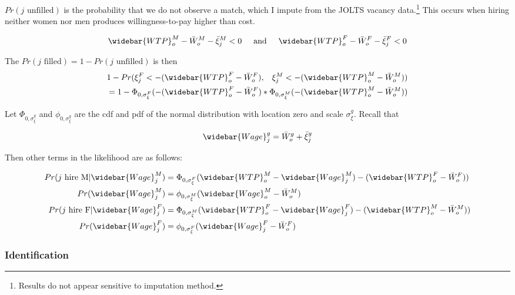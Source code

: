 \documentclass[11pt]{article}
\begin{document}
$Pr(\text{$j$ unfilled}) $ is the probability that we do not observe a match, which I impute from the JOLTS vacancy data.\footnote{Results do not appear sensitive to imputation method.} This occurs when hiring neither women nor men produces willingness-to-pay higher than cost.

\begin{align*}
 \widebar{WTP}^M_o - \bar{W}^M_o - \bar{\xi}^M_j < 0 \hspace{5mm} \text{and} \hspace{5mm} \widebar{WTP}^F_o - \bar{W}^F_o -  \bar{\xi}^F_j < 0 \\
\end{align*}

The $Pr( \text{$j$ filled}) = 1 - Pr( \text{$j$ unfilled}) $ is then
\begin{align*}
1- Pr(\xi^F_j< -(\widebar{WTP}^F_o - \bar{W}^F_o), \hspace{3mm} \xi^M_j< -(\widebar{WTP}^M_o - \bar{W}^M_o )) & \\
= 1 - \Phi_{0,\sigma^F_{\xi}}(-(\widebar{WTP}^F_o - \bar{W}^F_o)* \Phi_{0,\sigma^M_{\xi}}(-(\widebar{WTP}^M_o - \bar{W}^M_o))
\end{align*}

Let $\Phi_{0,\sigma^g_{\xi}}$ and $\phi_{0,\sigma^g_{\xi}}$ are the cdf and pdf of the normal distribution with location zero and scale $\sigma^g_{\xi}$. Recall that

$$ \widebar{Wage}^g_j = \bar{W}^g_o + \bar{\xi}^g_j $$

Then other terms in the likelihood are as follows:

\begin{align*}
Pr(\text{$j$ hire M} | \widebar{Wage}^M_{j} ) &= \Phi_{0,\sigma^F_{\xi}}( \widebar{WTP}^M_o -  \widebar{Wage}^M_j) - (\widebar{WTP}^F_o - \bar{W}^F_o))  \\
Pr(\widebar{Wage}^M_{j} ) &= \phi_{0,\sigma^M_{\xi}}( \widebar{Wage}^M_o - \bar{W}^M_o)  \\
Pr(\text{$j$ hire F} | \widebar{Wage}^F_{j}) &= \Phi_{0,\sigma^M_{\xi}}( \widebar{WTP}^F_o -  \widebar{Wage}^F_j) - (\widebar{WTP}^M_o - \bar{W}^M_o))  \\
Pr(\widebar{Wage}^F_{j}) &=  \phi_{0,\sigma^F_{\xi}}( \widebar{Wage}^F_j - \bar{W}^F_o)  \\
\end{align*}

\subsubsection{Identification}
\end{document}
